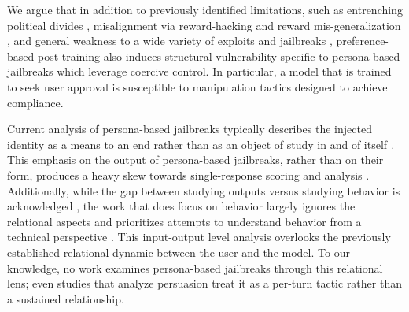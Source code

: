 We argue that in addition to previously identified limitations, such as entrenching political divides \cite{santurkar_whose_2023}, misalignment via reward-hacking and reward mis-generalization \cite{skalse_defining_2022, wang_reward_2026}, and general weakness to a wide variety of exploits and jailbreaks \cite{wei_jailbroken_2023}, preference-based post-training also induces structural vulnerability specific to persona-based jailbreaks which leverage coercive control. In particular, a model that is trained to seek user approval is susceptible to manipulation tactics designed to achieve compliance. 

Current analysis of persona-based jailbreaks typically describes the injected identity as a means to an end rather than as an object of study in and of itself \cite{shah_scalable_2023, zhang_enhancing_2025, sandhan_persona_2026, park_persona_2026, wei_jailbroken_2023}. This emphasis on the output of persona-based jailbreaks, rather than on their form, produces a heavy skew towards single-response scoring and analysis \cite{shah_scalable_2023, zeng_how_2024}. Additionally, while the gap between studying outputs versus studying behavior is acknowledged \cite{sandhan_persona_2026, park_persona_2026}, the work that does focus on behavior largely ignores the relational aspects and prioritizes attempts to understand behavior from a technical perspective \cite{park_persona_2026, zeng_how_2024}. This input-output level analysis overlooks the previously established relational dynamic between the user and the model. To our knowledge, no work examines persona-based jailbreaks through this relational lens; even studies that analyze persuasion \cite{zeng_how_2024} treat it as a per-turn tactic rather than a sustained relationship. 

